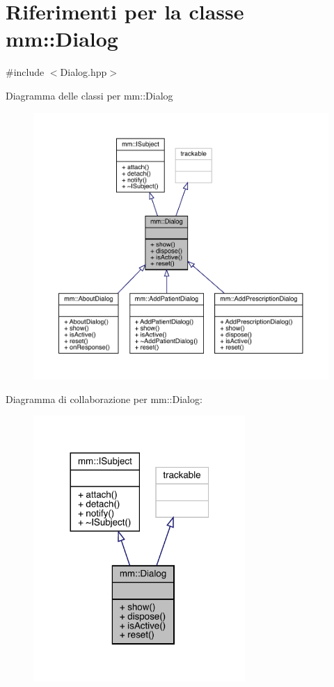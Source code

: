 \hypertarget{classmm_1_1_dialog}{}\section{Riferimenti per la classe mm\+:\+:Dialog}
\label{classmm_1_1_dialog}


{\ttfamily \#include $<$Dialog.\+hpp$>$}



Diagramma delle classi per mm\+:\+:Dialog\nopagebreak
\begin{figure}[H]
\begin{center}
\leavevmode
\includegraphics[width=350pt]{d8/dfd/classmm_1_1_dialog__inherit__graph}
\end{center}
\end{figure}


Diagramma di collaborazione per mm\+:\+:Dialog\+:\nopagebreak
\begin{figure}[H]
\begin{center}
\leavevmode
\includegraphics[width=228pt]{d7/d10/classmm_1_1_dialog__coll__graph}
\end{center}
\end{figure}
